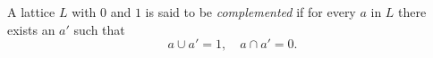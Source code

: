 A lattice $L$ with $0$ and $1$ is said to be \emph{complemented} if for every $a$ in $L$ there exists an $a'$ such that
$$a \cup a' = 1, \quad a \cap a' = 0.$$
